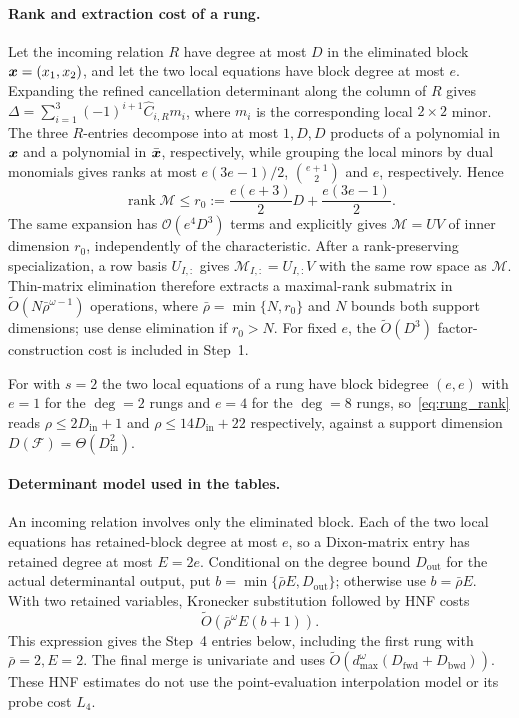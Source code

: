 \paragraph{Rank and extraction cost of a rung.}
Let the incoming relation $R$ have degree at most $D$ in the eliminated
block ${\boldsymbol{x}}=(x_1,x_2)$, and let the two local equations have block degree
at most $e$.
Expanding the refined cancellation determinant along the column of $R$
gives $\Delta=\sum_{i=1}^3(-1)^{i+1}\widehat C_{i,R}m_i$,
where $m_i$ is the corresponding local $2\times2$ minor.
The three $R$-entries decompose into at most $1,D,D$ products
of a polynomial in ${\boldsymbol{x}}$ and a polynomial in $\bar{{\boldsymbol{x}}}$, respectively,
while grouping the local minors by dual monomials gives ranks at most
$e(3e-1)/2$, $\binom{e+1}{2}$ and $e$, respectively. Hence
\begin{equation}\label{eq:rung_rank}
 \operatorname{rank}\mathcal M
 \le r_0:=\frac{e(e+3)}2D+\frac{e(3e-1)}2 .
\end{equation}
The same expansion has $\mathcal{O}(e^4D^3)$ terms and explicitly gives
$\mathcal M=UV$ of inner dimension $r_0$, independently of the
characteristic.
After a rank-preserving specialization, a row basis $U_{I,:}$ gives
$\mathcal M_{I,:}=U_{I,:}V$ with the same row space as $\mathcal M$.
Thin-matrix elimination therefore extracts a maximal-rank submatrix in
$\widetilde{O}(N\bar\rho^{\omega-1})$ operations, where
$\bar\rho=\min\{N,r_0\}$ and $N$ bounds both support dimensions;
use dense elimination if $r_0>N$.
For fixed $e$, the $\widetilde{O}(D^3)$ factor-construction cost is
included in Step~1.

For \vision with $s=2$ the two local equations of a rung have block bidegree $(e,e)$ with $e=1$ for the $\deg=2$ rungs and $e=4$ for the $\deg=8$ rungs, so~\eqref{eq:rung_rank} reads $\rho\le 2D_{\mathrm{in}}+1$ and $\rho\le 14D_{\mathrm{in}}+22$ respectively, against a support dimension $D(\mathcal{F})=\Theta(D_{\mathrm{in}}^{2})$.

\paragraph{Determinant model used in the tables.}
An incoming relation involves only the eliminated block. Each of the two local equations has retained-block degree at most $e$, so a Dixon-matrix entry has retained degree at most $E=2e$. Conditional on the degree bound $D_{\mathrm{out}}$ for the actual determinantal output, put $b=\min\{\bar\rho E,D_{\mathrm{out}}\}$; otherwise use $b=\bar\rho E$. With two retained variables, Kronecker substitution followed by HNF costs
\[
 \widetilde O\!\left(\bar\rho^\omega E(b+1)\right).
\]
This expression gives the Step~4 entries below, including the first rung with $\bar\rho=2,E=2$. The final merge is univariate and uses $\widetilde O(d_{\max}^{\omega}(D_{\mathrm{fwd}}+D_{\mathrm{bwd}}))$. These HNF estimates do not use the point-evaluation interpolation model or its probe cost $L_4$.

